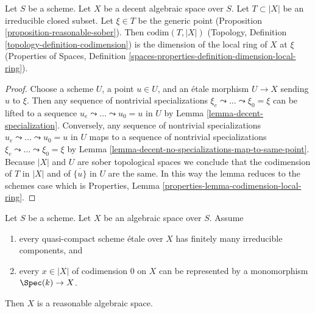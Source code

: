 \begin{lemma}
\label{lemma-codimension-local-ring}
Let $S$ be a scheme. Let $X$ be a decent algebraic space over $S$.
Let $T \subset |X|$ be an irreducible closed subset. Let $\xi \in T$
be the generic point (Proposition \ref{proposition-reasonable-sober}).
Then $\text{codim}(T, |X|)$
(Topology, Definition \ref{topology-definition-codimension})
is the dimension of the local ring of $X$ at $\xi$
(Properties of Spaces, Definition
\ref{spaces-properties-definition-dimension-local-ring}).
\end{lemma}

\begin{proof}
Choose a scheme $U$, a point $u \in U$, and an \'etale morphism
$U \to X$ sending $u$ to $\xi$. Then any sequence of nontrivial
specializations $\xi_e \leadsto \ldots \leadsto \xi_0 = \xi$
can be lifted to a sequence $u_e \leadsto \ldots \leadsto u_0 = u$ in $U$
by Lemma \ref{lemma-decent-specialization}.
Conversely, any sequence of nontrivial specializations
$u_e \leadsto \ldots \leadsto u_0 = u$ in $U$
maps to a sequence of nontrivial specializations
$\xi_e \leadsto \ldots \leadsto \xi_0 = \xi$ by
Lemma \ref{lemma-decent-no-specializations-map-to-same-point}.
Because $|X|$ and $U$ are sober topological spaces
we conclude that the codimension of $T$ in $|X|$
and of $\overline{\{u\}}$ in $U$ are the same.
In this way the lemma reduces to the schemes case which
is Properties, Lemma \ref{properties-lemma-codimension-local-ring}.
\end{proof}

\begin{lemma}
\label{lemma-get-reasonable}
Let $S$ be a scheme. Let $X$ be an algebraic space over $S$. Assume
\begin{enumerate}
\item every quasi-compact scheme \'etale over $X$ has finitely many
irreducible components, and
\item every $x \in |X|$ of codimension $0$ on $X$ can be represented
by a monomorphism $\Spec(k) \to X$.
\end{enumerate}
Then $X$ is a reasonable algebraic space.
\end{lemma}

